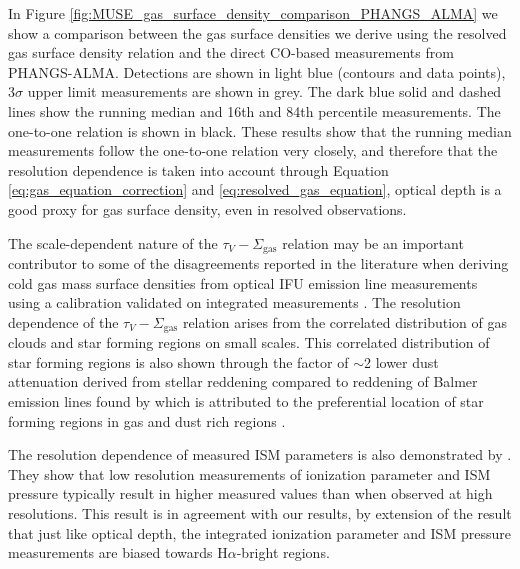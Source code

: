 \documentclass[fleqn,usenatbib]{mnras}
\begin{document}
In Figure \ref{fig:MUSE_gas_surface_density_comparison_PHANGS_ALMA} we show a comparison between the gas surface densities we derive using the resolved gas surface density relation and the direct CO-based measurements from PHANGS-ALMA. Detections are shown in light blue (contours and data points), 3$\sigma$ upper limit measurements are shown in grey. The dark blue solid and dashed lines show the running median and 16th and 84th percentile measurements. The one-to-one relation is shown in black. These results show that the running median measurements follow the one-to-one relation very closely, and therefore that the resolution dependence is taken into account through Equation \ref{eq:gas_equation_correction} and \ref{eq:resolved_gas_equation}, optical depth is a good proxy for gas surface density, even in resolved observations. 

The scale-dependent nature of the $\tau_V - \Sigma_{\textrm{gas}}$ relation may be an important contributor to some of the disagreements reported in the literature when deriving cold gas mass surface densities from optical IFU emission line measurements using a calibration validated on integrated measurements \cite[e.g.][]{barrera-ballesteros2020, barrera-ballesteros2021}. The resolution dependence of the  $\tau_V - \Sigma_{\textrm{gas}}$ relation arises from the correlated distribution of gas clouds and star forming regions on small scales. This correlated distribution of star forming regions is also shown through the factor of $\sim$2 lower dust attenuation derived from stellar reddening compared to reddening of Balmer emission lines found by \cite{kreckel2013} which is attributed to the preferential location of star forming regions in gas and dust rich regions \citep{calzetti1994, calzetti2000, charlot2000, hao2011}.

The resolution dependence of measured ISM parameters is also demonstrated by \cite{grasha2022}. They show that low resolution measurements of ionization parameter and ISM pressure typically result in higher measured values than when observed at  high resolutions. This result is in agreement with our results, by extension of the result that just like optical depth, the integrated ionization parameter and ISM pressure measurements are biased towards H$\alpha$-bright regions. 
\end{document}
